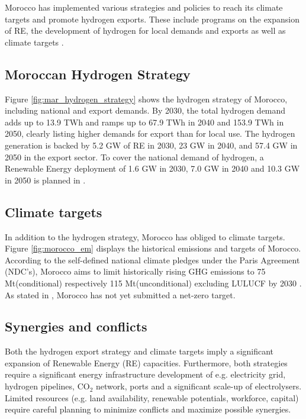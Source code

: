 Morocco has implemented various strategies and policies to reach its climate targets and promote hydrogen exports. These include programs on the expansion of RE, the development of hydrogen for local demands and exports as well as climate targets \cite{MarHyStrat2021, CAT2021}.


\subsection{Moroccan Hydrogen Strategy}
Figure \ref{fig:mar_hydrogen_strategy} shows the hydrogen strategy of Morocco, including national and export demands.
By 2030, the total hydrogen demand adds up to 13.9 TWh and ramps up to 67.9 TWh in 2040 and 153.9 TWh in 2050, 
clearly listing higher demands for export than for local use. The hydrogen generation is backed by 5.2 GW of RE in 2030, 23 GW in 2040, and 57.4 GW in 2050 in the export sector. To cover the national demand of hydrogen, a Renewable Energy deployment of 1.6 GW in 2030, 7.0 GW in 2040 and 10.3 GW in 2050 is planned in \cite{MarHyStrat2021}.


\subsection{Climate targets}
In addition to the hydrogen strategy, Morocco has obliged to climate targets. Figure \ref{fig:morocco_em} displays the historical emissions and targets of Morocco.
According to the self-defined national climate pledges under the Paris Agreement (NDC's), Morocco aims to limit historically rising GHG emissions to 75 Mt\coe (conditional) respectively 115 Mt\coe (unconditional) excluding LULUCF by 2030 \cite{CAT2021}. 
As stated in \cite{CAT2021}, Morocco has not yet submitted a net-zero target. 

\subsection{Synergies and conflicts}
Both the hydrogen export strategy and climate targets imply a significant expansion of Renewable Energy (RE) capacities. Furthermore, both strategies require a significant energy infrastructure development of e.g. electricity grid, hydrogen pipelines, $\mathrm{CO_2}$ network, ports and a significant scale-up of electrolysers.
Limited resources (e.g. land availability, renewable potentials, workforce, capital) require careful planning to minimize conflicts and maximize possible synergies.

